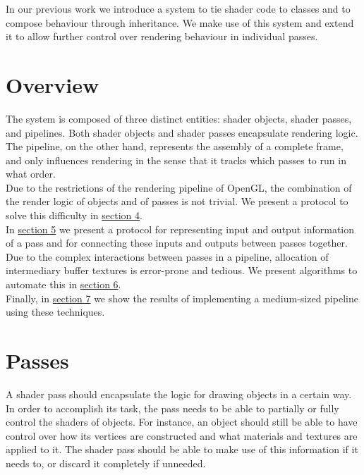 \documentclass[format=sigconf]{acmart}
\begin{document}
In our previous work\cite{glsloop} we introduce a system to tie shader code to classes and to compose behaviour through inheritance. We make use of this system and extend it to allow further control over rendering behaviour in individual passes.

\section{Overview}\label{overview}
The system is composed of three distinct entities: shader objects, shader passes, and pipelines. Both shader objects and shader passes encapsulate rendering logic. The pipeline, on the other hand, represents the assembly of a complete frame, and only influences rendering in the sense that it tracks which passes to run in what order. \\

Due to the restrictions of the rendering pipeline of OpenGL, the combination of the render logic of objects and of passes is not trivial. We present a protocol to solve this difficulty in \hyperref[passes]{section 4}. \\

In \hyperref[pipelines]{section 5} we present a protocol for representing input and output information of a pass and for connecting these inputs and outputs between passes together. \\

Due to the complex interactions between passes in a pipeline, allocation of intermediary buffer textures is error-prone and tedious. We present algorithms to automate this in \hyperref[allocation]{section 6}. \\

Finally, in \hyperref[concept]{section 7} we show the results of implementing a medium-sized pipeline using these techniques.

\section{Passes}\label{passes}
A shader pass should encapsulate the logic for drawing objects in a certain way. In order to accomplish its task, the pass needs to be able to partially or fully control the shaders of objects. For instance, an object should still be able to have control over how its vertices are constructed and what materials and textures are applied to it. The shader pass should be able to make use of this information if it needs to, or discard it completely if unneeded. \\
\end{document}
